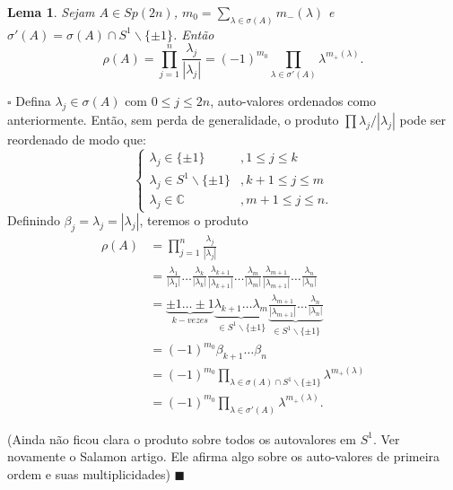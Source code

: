 \documentclass[12pt]{book}
\newtheorem{lema}[teorema]{Lema}
\newenvironment{prova}[1]{$\square$ #1}{\hfill$\blacksquare$}
\newcommand{\circulo}{S^{1}}
\newcommand{\complementar}[2]{#1 \backslash #2}
\newcommand{\complexo}[1]{\mathbb{C}^{#1}}
\newcommand{\gruposimpletico}[1]{Sp(#1)}
\newcommand{\vermelho}[1]{{\color{red}#1}}
\begin{document}
	\begin{lema}\label{lema_identidade_aplicacao_rho}
		Sejam $A \in \gruposimpletico{2n}$, $m_{0} = \sum_{\lambda \in \sigma(A)} m_{-}(\lambda)$  e $\sigma'(A)=\sigma(A)\cap \complementar{\circulo}{\{ \pm 1 \}}$. Então
		$$
		\rho(A) = \prod_{j=1}^{n}\frac{\lambda_{j}}{|\lambda_{j}|} =(-1)^{m_{0}} \prod_{\lambda \in \sigma'(A) }\lambda^{m_{+}(\lambda)} .
		$$
	\end{lema}
	\begin{prova}
		Defina $\lambda_{j} \in \sigma(A)$ com $0\leq j \leq 2n$, auto-valores ordenados como anteriormente. Então, sem perda de generalidade, o produto $\prod \lambda_{j}/|\lambda_{j}|$ pode ser reordenado de modo que:
		$$
		\left\{
		\begin{array}{cc}
		\lambda_{j} \in \{\pm 1\} &, 1\leq j \leq k
		\\
		\lambda_{j} \in \complementar{\circulo}{\{\pm 1\}} &, k+1\leq j \leq m
		\\
		\lambda_{j} \in \complexo{} &, m+1\leq j \leq n.
		\end{array}
		\right.
		$$
		Definindo $\beta_{j} = \lambda_{j} = |\lambda_{j}|$, teremos o produto
		$$
		\begin{aligned}
		\rho(A)&=\prod_{j=1}^{n}\frac{\lambda_{j}}{|\lambda_{j}|}
		\\
		&=
		\frac{\lambda_{1}}{|\lambda_{1}|} \dots \frac{\lambda_{k}}{|\lambda_{k}|}
		\frac{\lambda_{k+1}}{|\lambda_{k+1}|} \dots  \frac{\lambda_{m}}{|\lambda_{m}|}
		\frac{\lambda_{m+1}}{|\lambda_{m+1}|} \dots 
		\frac{\lambda_{n}}{|\lambda_{n}|}
		\\
		&=
		\underbrace{\pm 1 \dots \pm 1}_{k-vezes}
		\underbrace{\lambda_{k+1}\dots  \lambda_{m}}_{\in \complementar{\circulo}{\{\pm 1 \}}}
		\underbrace{	\frac{\lambda_{m+1}}{|\lambda_{m+1}|} \dots 
			\frac{\lambda_{n}}{|\lambda_{n}|}}_{\in \complementar{\circulo}{\{\pm 1 \}}}	
		\\
		&=
		(-1)^{m_{0}}\beta_{k+1}\dots \beta_{n}	
		\\
		&=	(-1)^{m_{0}} \prod_{\lambda \in \sigma(A) \cap\complementar{\circulo}{\{ \pm 1 \}}} \lambda^{m_{+}(\lambda)}
		\\
		&=	(-1)^{m_{0}} \prod_{\lambda \in \sigma'(A)}\lambda^{m_{+}(\lambda)}.
		\end{aligned}
		$$
		
		\vermelho{(Ainda não ficou clara o produto sobre todos os autovalores em $\circulo$. Ver novamente o Salamon artigo. Ele afirma algo sobre os auto-valores de primeira ordem e suas multiplicidades)}
	\end{prova}
	
\end{document}

